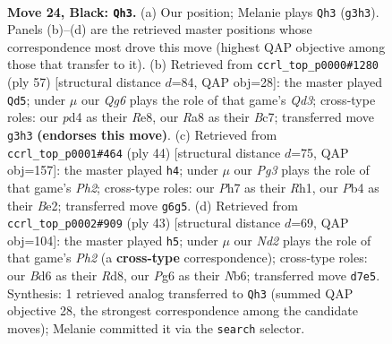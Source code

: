 \documentclass[11pt]{article}
\begin{document}
\clearpage

\begin{figure}[p]\centering
\begin{subfigure}{0.46\textwidth}\centering
\resizebox{\linewidth}{!}{%
\newchessgame
\chessboard[
  setfen={r6r/3nk2p/1ppbp1p1/8/1p1P3P/P3P1q1/1P3RN1/R1BQ2K1 b - - 0 24},
  showmover=false,
  pgfstyle=straightmove, color=movearrow, markmove={g3-h3}
]}
\caption{}
\end{subfigure}\hfill
\begin{subfigure}{0.46\textwidth}\centering
\resizebox{\linewidth}{!}{%
\newchessgame
\chessboard[
  setfen={2r1r1k1/2b3p1/3qp2p/p1P1Np2/3PnP2/3QB2P/R5P1/5RK1 b - - 0 29},
  showmover=false,
  pgfstyle=straightmove, color=movearrow, markmove={d6-d5}
]}
\caption{}
\end{subfigure}
\\[4pt]
\begin{subfigure}{0.46\textwidth}\centering
\resizebox{\linewidth}{!}{%
\newchessgame
\chessboard[
  setfen={r5k1/4qpp1/1p1rbn1p/2p1Q3/P3p3/4P3/1B1PBPPP/R3K2R w KQ - 0 23},
  showmover=false,
  pgfstyle=straightmove, color=movearrow, markmove={h2-h4}
]}
\caption{}
\end{subfigure}\hfill
\begin{subfigure}{0.46\textwidth}\centering
\resizebox{\linewidth}{!}{%
\newchessgame
\chessboard[
  setfen={2kr3r/1pp4p/1n4p1/Q2Ppb2/P6P/2N1qP2/1P1RB1P1/2K4R b - - 4 22},
  showmover=false,
  pgfstyle=straightmove, color=movearrow, markmove={h7-h5}
]}
\caption{}
\end{subfigure}
\caption{\textbf{Move 24, Black: \texttt{Qh3}.} (a) Our position; Melanie plays \texttt{Qh3} (\texttt{g3h3}). Panels (b)--(d) are the retrieved master positions whose correspondence most drove this move (highest QAP objective among those that transfer to it). (b) Retrieved from \texttt{ccrl\_top\_p0000\#1280} (ply 57) [structural distance $d$=84, QAP obj=28]: the master played \texttt{Qd5}; under $\mu$ our \emph{Qg6} plays the role of that game's \emph{Qd3}; cross-type roles: our \emph{p}d4 as their \emph{R}e8, our \emph{R}a8 as their \emph{B}c7; transferred move \texttt{g3h3} \textbf{(endorses this move)}. (c) Retrieved from \texttt{ccrl\_top\_p0001\#464} (ply 44) [structural distance $d$=75, QAP obj=157]: the master played \texttt{h4}; under $\mu$ our \emph{Pg3} plays the role of that game's \emph{Ph2}; cross-type roles: our \emph{P}h7 as their \emph{R}h1, our \emph{P}b4 as their \emph{B}e2; transferred move \texttt{g6g5}. (d) Retrieved from \texttt{ccrl\_top\_p0002\#909} (ply 43) [structural distance $d$=69, QAP obj=104]: the master played \texttt{h5}; under $\mu$ our \emph{Nd2} plays the role of that game's \emph{Ph2} (a \textbf{cross-type} correspondence); cross-type roles: our \emph{B}d6 as their \emph{R}d8, our \emph{P}g6 as their \emph{N}b6; transferred move \texttt{d7e5}. Synthesis: 1 retrieved analog transferred to \texttt{Qh3} (summed QAP objective 28, the strongest correspondence among the candidate moves); Melanie committed it via the \texttt{search} selector.}
\label{fig:thought-m47}
\end{figure}
\end{document}

